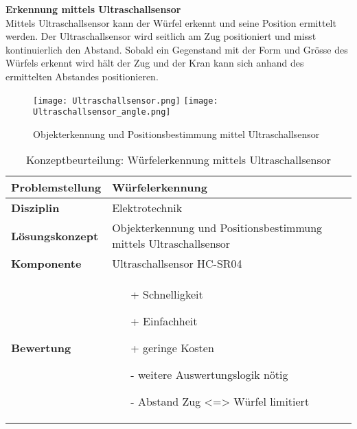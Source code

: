 \documentclass[../../main.tex]{subfiles}
\begin{document}
    \textbf{Erkennung mittels Ultraschallsensor}\\
    Mittels Ultraschallsensor kann der Würfel erkennt und seine Position ermittelt werden. Der Ultraschallsensor
    wird seitlich am Zug positioniert und misst kontinuierlich den Abstand. Sobald ein Gegenstand mit der Form und
    Grösse des Würfels erkennt wird hält der Zug und der Kran kann sich anhand des ermittelten Abstandes 
    positionieren.
    \begin{figure}[H] %
        \centering
        \texttt{[image: Ultraschallsensor.png]}
        \texttt{[image: Ultraschallsensor\_angle.png]}
        \caption{Objekterkennung und Positionsbestimmung mittel Ultraschallsensor}
        \label{fig:wurfel_ultraschall}
    \end{figure}

    \begin{flushleft}
        \begin{table}[h]
        \begin{tabular}{ | l | p{11cm} |}
        \hline
        \textbf{Problemstellung} & Würfelerkennung \\ \hline
        \textbf{Disziplin} & Elektrotechnik \\ \hline
        \textbf{Lösungskonzept} & Objekterkennung und Positionsbestimmung mittels Ultraschallsensor \\ \hline
        \textbf{Komponente} & Ultraschallsensor HC-SR04 \\ \hline
        \textbf{Bewertung} &  \begin{itemize}
                                \item[+] Schnelligkeit
                                \item[+] Einfachheit
                                \item[+] geringe Kosten 
                                \item[-] weitere Auswertungslogik nötig
                                \item[-] Abstand Zug <=> Würfel limitiert   
                              \end{itemize} \\ \hline
        \end{tabular}
        \caption{Konzeptbeurteilung: Würfelerkennung mittels Ultraschallsensor}
        \label{tab:konzept_wurfel_ultraschall}
    \end{table}
    \end{flushleft}
\end{document}
